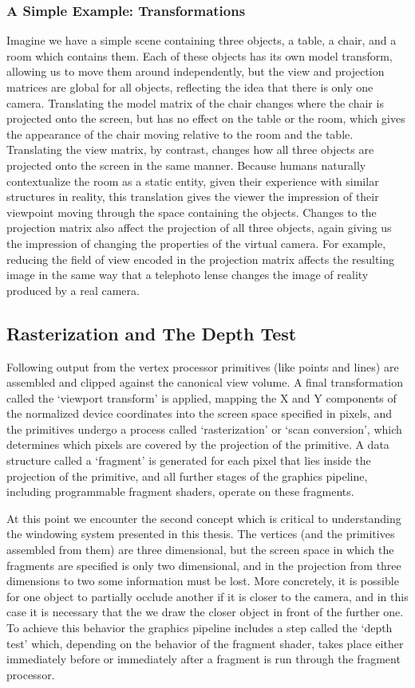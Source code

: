 \subsubsection{A Simple Example: Transformations}

Imagine we have a simple scene containing three objects, a table, a chair, and a room which contains them. Each of these objects has its own model transform, allowing us to move them around independently, but the view and projection matrices are global for all objects, reflecting the idea that there is only one camera. Translating the model matrix of the chair changes where the chair is projected onto the screen, but has no effect on the table or the room, which gives the appearance of the chair moving relative to the room and the table. Translating the view matrix, by contrast, changes how all three objects are projected onto the screen in the same manner. Because humans naturally contextualize the room as a static entity, given their experience with similar structures in reality, this translation gives the viewer the impression of their viewpoint moving through the space containing the objects. Changes to the projection matrix also affect the projection of all three objects, again giving us the impression of changing the properties of the virtual camera. For example, reducing the field of view encoded in the projection matrix affects the resulting image in the same way that a telephoto lense changes the image of reality produced by a real camera. 

\subsection{Rasterization and The Depth Test}
Following output from the vertex processor primitives (like points and lines) are assembled and clipped against the canonical view volume. A final transformation called the ‘viewport transform’ is applied, mapping the X and Y components of the normalized device coordinates into the screen space specified in pixels, and the primitives undergo a process called ‘rasterization’ or ‘scan conversion’, which determines which pixels are covered by the projection of the primitive. A data structure called a ‘fragment’ is generated for each pixel that lies inside the projection of the primitive, and all further stages of the graphics pipeline, including programmable fragment shaders, operate on these fragments. 

At this point we encounter the second concept which is critical to understanding the windowing system presented in this thesis. The vertices (and the primitives assembled from them) are three dimensional, but the screen space in which the fragments are specified is only two dimensional, and in the projection from three dimensions to two some information must be lost. More concretely, it is possible for one object to partially occlude another if it is closer to the camera, and in this case it is necessary that the we draw the closer object in front of the further one. To achieve this behavior the graphics pipeline includes a step called the ‘depth test’ which, depending on the behavior of the fragment shader, takes place either immediately before or immediately after a fragment is run through the fragment processor.

